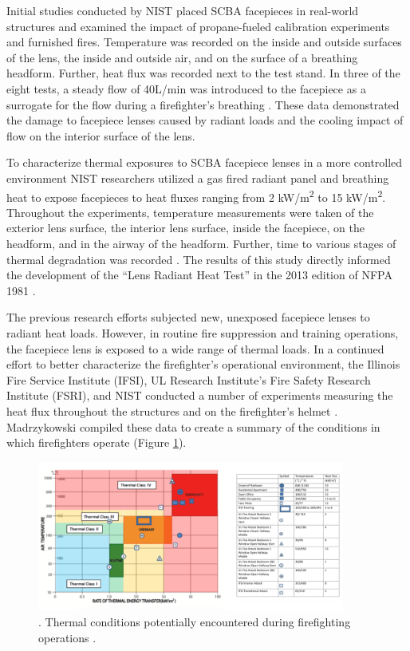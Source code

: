 \documentclass[sn-mathphys]{sn-jnl}%
\theoremstyle{thmstyleone}%
\theoremstyle{thmstyletwo}%
\theoremstyle{thmstylethree}%
\begin{document}
Initial studies conducted by NIST placed SCBA facepieces in real-world structures and examined the impact of propane-fueled calibration experiments and furnished fires. Temperature was recorded on the inside and outside surfaces of the lens, the inside and outside air, and on the surface of a breathing headform. Further, heat flux was recorded next to the test stand. In three of the eight tests, a steady flow of 40L/min was introduced to the facepiece as a surrogate for the flow during a firefighter’s breathing \cite{mensch_fire_2011}. These data demonstrated the damage to facepiece lenses caused by radiant loads and the cooling impact of flow on the interior surface of the lens. 

To characterize thermal exposures to SCBA facepiece lenses in a more controlled environment NIST researchers utilized a gas fired radiant panel and breathing heat to expose facepieces to heat fluxes ranging from 2 kW/m\textsuperscript{2} to 15 kW/m\textsuperscript{2}. Throughout the experiments, temperature measurements were taken of the exterior lens surface, the interior lens surface, inside the facepiece, on the headform, and in the airway of the headform. Further, time to various stages of thermal degradation was recorded \cite{putorti_thermal_2013}. The results of this study directly informed the development of the “Lens Radiant Heat Test” in the 2013 edition of NFPA 1981 \cite{national_fire_protection_association_nfpa_2013}. 

The previous research efforts subjected new, unexposed facepiece lenses to radiant heat loads. However, in routine fire suppression and training operations, the facepiece lens is exposed to a wide range of thermal loads. In a continued effort to better characterize the firefighter’s operational environment, the Illinois Fire Service Institute (IFSI), UL Research Institute's Fire Safety Research Institute (FSRI), and NIST conducted a number of experiments measuring the heat flux throughout the structures and on the firefighter’s helmet \cite{madrzykowski_townhouse_2011,willi_characterizing_2016,zevotek_impact_2018,kerber_effect_2019}. Madrzykowski compiled these data to create a summary of the conditions in which firefighters operate (Figure \ref{fig1}).%

\begin{figure}[h]%
\centering
\includegraphics[width=0.9\textwidth]{Fig1_ThermalClass.png}
\caption{. Thermal conditions potentially encountered during firefighting operations \cite{madrzykowski_fire_2017}.}\label{fig1}
\end{figure}
\end{document}
